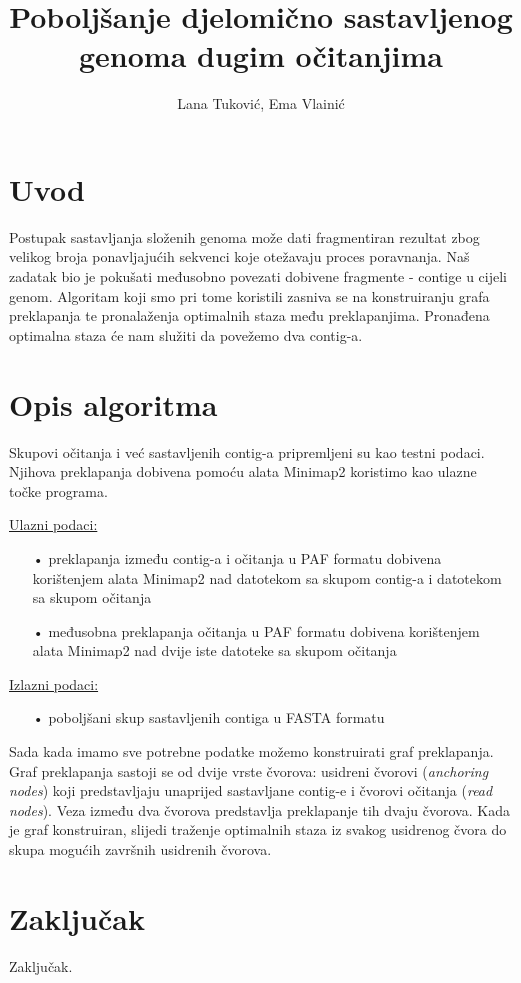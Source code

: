 \documentclass[times, utf8, seminar]{fer}
\begin{document}
\title{Poboljšanje djelomično sastavljenog genoma dugim očitanjima}

\author{Lana Tuković, Ema Vlainić}


\maketitle

\tableofcontents

\chapter{Uvod}
Postupak sastavljanja složenih genoma može dati fragmentiran rezultat zbog velikog broja ponavljajućih sekvenci koje otežavaju proces poravnanja. Naš zadatak bio je pokušati međusobno povezati dobivene fragmente - contige u cijeli genom. Algoritam koji smo pri tome koristili zasniva se na konstruiranju grafa preklapanja te pronalaženja optimalnih staza među preklapanjima. Pronađena optimalna staza će nam služiti da povežemo dva contig-a.

\chapter{Opis algoritma}
Skupovi očitanja i već sastavljenih contig-a pripremljeni su kao testni podaci. Njihova preklapanja dobivena pomoću alata Minimap2 koristimo kao ulazne točke programa.

\underline{Ulazni podaci:}
\begin{itemize}
	\item[•]{preklapanja između contig-a i očitanja u PAF formatu dobivena korištenjem alata Minimap2 nad datotekom sa skupom contig-a i datotekom sa skupom očitanja}
	\item[•]{međusobna preklapanja očitanja u PAF formatu dobivena korištenjem alata Minimap2 nad dvije iste datoteke sa skupom očitanja}
\end{itemize}

\underline{Izlazni podaci:}
\begin{itemize}
	\item[•]{poboljšani skup sastavljenih contiga u FASTA formatu}
\end{itemize}

\begin{flushleft}
Sada kada imamo sve potrebne podatke možemo konstruirati graf preklapanja. Graf preklapanja sastoji se od dvije vrste čvorova: usidreni čvorovi (\textit{anchoring nodes}) koji predstavljaju unaprijed sastavljane contig-e i čvorovi očitanja (\textit{read nodes}). Veza između dva čvorova predstavlja preklapanje tih dvaju čvorova. Kada je graf konstruiran, slijedi traženje optimalnih staza iz svakog usidrenog čvora do skupa mogućih završnih usidrenih čvorova.
\end{flushleft}


\chapter{Zaključak}
Zaključak.



\end{document}
